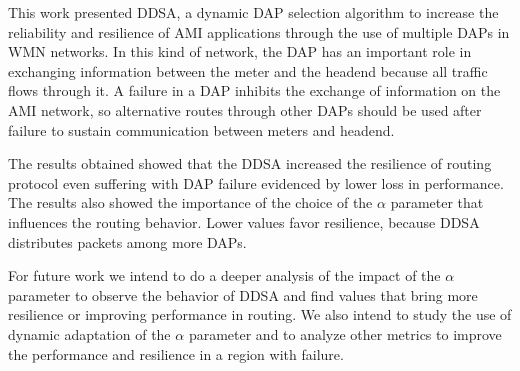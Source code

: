 \documentclass[conference]{IEEEtran}
\begin{document}
This work presented DDSA, a dynamic DAP selection algorithm to increase the reliability and resilience of AMI applications through the use of multiple DAPs in WMN networks. In this kind of network, the DAP has an important role in exchanging information between the meter and the headend because all traffic flows through it. A failure in a DAP inhibits the exchange of information on the AMI network, so alternative routes through other DAPs should be used after failure to sustain communication between meters and headend.

The results obtained showed that the DDSA increased the resilience of routing protocol even suffering with DAP failure evidenced by lower loss in performance. The results also showed the importance of the choice of the $\alpha$ parameter that influences the routing behavior. Lower values favor resilience, because DDSA distributes packets among more DAPs.


For future work we intend to do a deeper analysis of the impact of the $\alpha$ parameter to observe the behavior of DDSA and find values that bring more resilience or improving performance in routing. 
We also intend to study the use of dynamic adaptation of the $\alpha$ parameter and to analyze other metrics to improve the performance and resilience in a region with failure.



%
\end{document}
